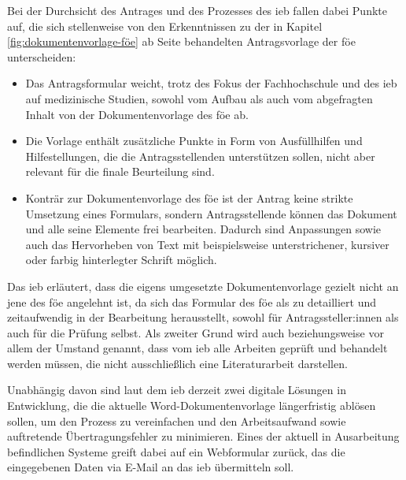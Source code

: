\documentclass[a4paper,12pt,twoside]{scrreprt}
\begin{document}
\medskip

Bei der Durchsicht des Antrages und des Prozesses des \ac{ieb} fallen dabei Punkte auf, die sich stellenweise von den Erkenntnissen zu der in Kapitel \ref{fig:dokumentenvorlage-föe} ab Seite \pageref{sub-sec:vorlage-föe} behandelten Antragsvorlage der \ac{föe} unterscheiden:
\begin{itemize}
    \item Das Antragsformular weicht, trotz des Fokus der Fachhochschule und des \ac{ieb} auf medizinische Studien, sowohl vom Aufbau als auch vom abgefragten Inhalt von der Dokumentenvorlage des \ac{föe} ab.
    \item Die Vorlage enthält zusätzliche Punkte in Form von Ausfüllhilfen und Hilfestellungen, die die Antragsstellenden unterstützen sollen, nicht aber relevant für die finale Beurteilung sind.
    \item Konträr zur Dokumentenvorlage des \ac{föe} ist der Antrag keine strikte Umsetzung eines Formulars, sondern Antragsstellende können das Dokument und alle seine Elemente frei bearbeiten. Dadurch sind Anpassungen sowie auch das Hervorheben von Text mit beispielsweise unterstrichener, kursiver oder farbig hinterlegter Schrift möglich.
\end{itemize}

Das \ac{ieb} erläutert, dass die eigens umgesetzte Dokumentenvorlage gezielt nicht an jene des \ac{föe} angelehnt ist, da sich das Formular des \ac{föe} als zu detailliert und zeitaufwendig in der Bearbeitung herausstellt, sowohl für Antragssteller:innen als auch für die Prüfung selbst. Als zweiter Grund wird auch beziehungsweise vor allem der Umstand genannt, dass vom \ac{ieb} alle Arbeiten geprüft und behandelt werden müssen, die nicht ausschließlich eine Literaturarbeit darstellen. \cite{rosendahl-huber_extern-erfahrungen_2023}

Unabhängig davon sind laut dem \ac{ieb} derzeit zwei digitale Lösungen in Entwicklung, die die aktuelle Word-Dokumentenvorlage längerfristig ablösen sollen, um den Prozess zu vereinfachen und den Arbeitsaufwand sowie auftretende Übertragungsfehler zu minimieren. Eines der aktuell in Ausarbeitung befindlichen Systeme greift dabei auf ein Webformular zurück, das die eingegebenen Daten via E-Mail an das \ac{ieb} übermitteln soll. \cite{rosendahl-huber_extern-erfahrungen_2023}
\end{document}
